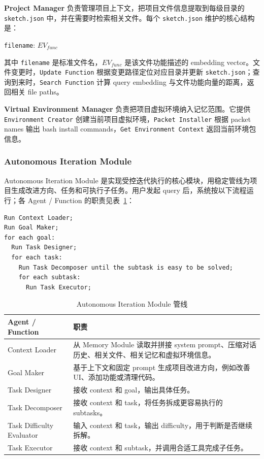 \documentclass[12pt,a4paper]{ctexart}
\begin{document}
\textbf{Project Manager} 负责管理项目上下文，把项目文件信息提取到每级目录的 \texttt{sketch.json} 中，并在需要时检索相关文件。每个 \texttt{sketch.json} 维护的核心结构是：

\begin{center}
\texttt{filename}: $EV_{func}$
\end{center}

其中 \texttt{filename} 是标准文件名，$EV_{func}$ 是该文件功能描述的 embedding vector。文件变更时，\texttt{Update Function} 根据变更路径定位对应目录并更新 \texttt{sketch.json}；查询到来时，\texttt{Search Function} 计算 query embedding 与文件功能向量的距离，返回相关 file paths。

\textbf{Virtual Environment Manager} 负责把项目虚拟环境纳入记忆范围。它提供 \texttt{Environment Creator} 创建当前项目虚拟环境，\texttt{Packet Installer} 根据 packet names 输出 bash install commands，\texttt{Get Environment Context} 返回当前环境包信息。

\subsubsection{Autonomous Iteration Module}

Autonomous Iteration Module 是实现受控迭代执行的核心模块，用稳定管线为项目生成改进方向、任务和可执行子任务。用户发起 query 后，系统按以下流程运行；各 Agent / Function 的职责见表~\ref{tab:autonomous-iteration}：

\begin{verbatim}
Run Context Loader;
Run Goal Maker;
for each goal:
  Run Task Designer;
  for each task:
    Run Task Decomposer until the subtask is easy to be solved;
    for each subtask:
      Run Task Executor;
\end{verbatim}

\begin{table}[htbp]
  \centering
  \small
  \begin{tabularx}{\textwidth}{p{3.4cm} X}
    \toprule
    \textbf{Agent / Function} & \textbf{职责} \\
    \midrule
    Context Loader & 从 Memory Module 读取并拼接 system prompt、压缩对话历史、相关文件、相关记忆和虚拟环境信息。 \\
    Goal Maker & 基于上下文和固定 prompt 生成项目改进方向，例如改善 UI、添加功能或清理代码。 \\
    Task Designer & 接收 context 和 goal，输出具体任务。 \\
    Task Decomposer & 接收 context 和 task，将任务拆成更容易执行的 subtasks。 \\
    Task Difficulty Evaluator & 输入 context 和 task，输出 difficulty，用于判断是否继续拆解。 \\
    Task Executor & 接收 context 和 subtask，并调用合适工具完成子任务。 \\
    \bottomrule
  \end{tabularx}
  \caption{Autonomous Iteration Module 管线}
  \label{tab:autonomous-iteration}
\end{table}
\end{document}
